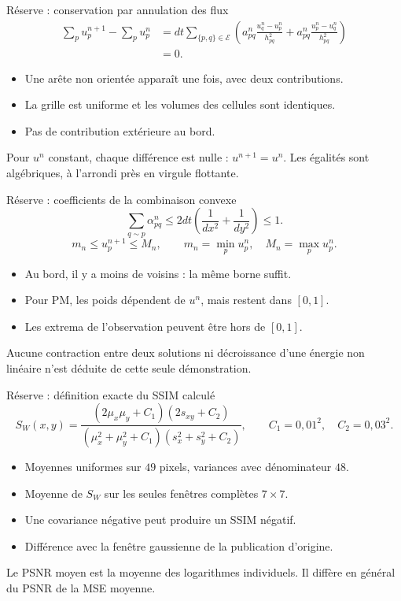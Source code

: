 \documentclass[aspectratio=169,11pt]{beamer}
\newcommand{\sectionlabel}{Projet de Master}
\newcommand{\smallgap}{\vspace{0.18cm}}
\begin{document}
\renewcommand{\sectionlabel}{Réserves / Analyse et figures}
\begin{frame}[label=reserve-conservation]{Réserve : conservation par annulation des flux}
  \[
    \begin{aligned}
      \sum_p u^{n+1}_p-\sum_p u^n_p
      &=dt\sum_{\{p,q\}\in\mathcal E}
       \left(a_{pq}^n\frac{u_q^n-u_p^n}{h_{pq}^2}
            +a_{pq}^n\frac{u_p^n-u_q^n}{h_{pq}^2}\right)\\
      &=0.
    \end{aligned}
  \]
  \begin{itemize}
    \item Une arête non orientée apparaît une fois, avec deux contributions.
    \item La grille est uniforme et les volumes des cellules sont identiques.
    \item Pas de contribution extérieure au bord.
  \end{itemize}
  \smallgap
  Pour $u^n$ constant, chaque différence est nulle : $u^{n+1}=u^n$.
  Les égalités sont algébriques, à l'arrondi près en virgule flottante.
\end{frame}

\begin{frame}[label=reserve-maximum]{Réserve : coefficients de la combinaison convexe}
  \[
    \sum_{q\sim p}\alpha_{pq}^n
     \leq 2dt\left(\frac1{dx^2}+\frac1{dy^2}\right)\leq1.
  \]
  \[
    m_n\leq u_p^{n+1}\leq M_n,
    \qquad m_n=\min_pu_p^n,\quad M_n=\max_pu_p^n.
  \]
  \begin{itemize}
    \item Au bord, il y a moins de voisins : la même borne suffit.
    \item Pour PM, les poids dépendent de $u^n$, mais restent dans $[0,1]$.
    \item Les extrema de l'observation peuvent être hors de $[0,1]$.
  \end{itemize}
  \smallgap
  Aucune contraction entre deux solutions ni décroissance d'une énergie
  non linéaire n'est déduite de cette seule démonstration.
\end{frame}

\begin{frame}[label=reserve-ssim]{Réserve : définition exacte du SSIM calculé}
  \[
    S_W(x,y)=
    \frac{(2\mu_x\mu_y+C_1)(2s_{xy}+C_2)}
    {(\mu_x^2+\mu_y^2+C_1)(s_x^2+s_y^2+C_2)},
    \qquad C_1=0{,}01^2,\quad C_2=0{,}03^2.
  \]
  \begin{itemize}
    \item Moyennes uniformes sur $49$ pixels, variances avec dénominateur $48$.
    \item Moyenne de $S_W$ sur les seules fenêtres complètes $7\times7$.
    \item Une covariance négative peut produire un SSIM négatif.
    \item Différence avec la fenêtre gaussienne de la publication d'origine.
  \end{itemize}
  \smallgap
  Le PSNR moyen est la moyenne des logarithmes individuels.
  Il diffère en général du PSNR de la MSE moyenne.
\end{frame}
\end{document}
